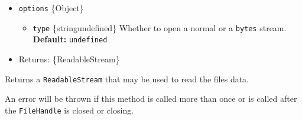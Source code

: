 \begin{itemize}
\tightlist
\item
  \texttt{options} \{Object\}

  \begin{itemize}
  \tightlist
  \item
    \texttt{type} \{string\textbar undefined\} Whether to open a normal
    or a \texttt{\textquotesingle{}bytes\textquotesingle{}} stream.
    \textbf{Default:} \texttt{undefined}
  \end{itemize}
\item
  Returns: \{ReadableStream\}
\end{itemize}

Returns a \texttt{ReadableStream} that may be used to read the files
data.

An error will be thrown if this method is called more than once or is
called after the \texttt{FileHandle} is closed or closing.

\begin{Shaded}
\begin{Highlighting}[]
\NormalTok{ \{}
\OperatorTok{,}
\NormalTok{\} } \OperatorTok{;}

\OperatorTok{=}  \NormalTok{(}\NormalTok{)}\OperatorTok{;}

 \NormalTok{ (}\NormalTok{())}
  \OperatorTok{;}

\NormalTok{()}\OperatorTok{;}
\end{Highlighting}
\end{Shaded}

